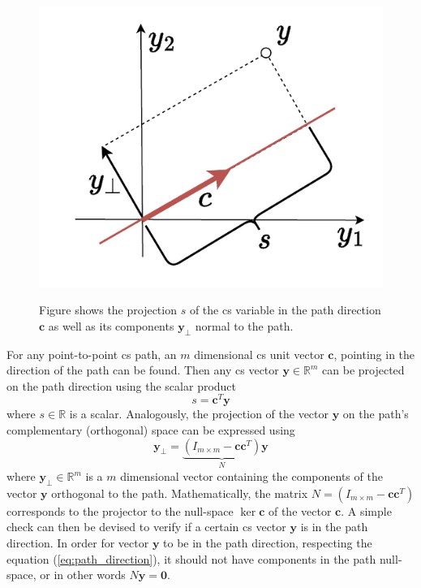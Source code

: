 \begin{figure}
\vspace{-0.5cm}
    \includegraphics[width=\linewidth]{Papers/imgs/decomposiiton.pdf}
    \label{fig:decomp}
    \caption{Figure shows the projection $s$ of the \gls{cs} variable in the path direction $\bm{c}$ as well as its components $\bm{y}_{\perp}$ normal to the path.}
\end{figure}
For any point-to-point \gls{cs} path, an $m$ dimensional \gls{cs} unit vector $\bm{c}$, pointing in the direction of the path can be found. Then any \gls{cs} vector $\bm{y}\in\mathbb{R}^m$ can be projected on the path direction using the scalar product
\begin{equation}
s = \bm{c}^T\bm{y}
\label{eq:path_direction}
\end{equation}
where $s\in\mathbb{R}$ is a scalar. Analogously, the projection of the vector $\bm{y}$ on the path's complementary (orthogonal) space can be expressed using \cite[p. 431]{meyer2001Matrix}
\begin{equation}
\bm{y}_\perp = \underbrace{(I_{m\times m} - \bm{c}\bm{c}^T)}_{N}\bm{y}
\label{eq:path_orthoonal}
\end{equation}
where $\bm{y}_\perp\in\mathbb{R}^m$ is a $m$ dimensional vector containing the components of the vector $\bm{y}$ orthogonal to the path. Mathematically, the matrix $N = (I_{m\times m} - \bm{c}\bm{c}^T)$ corresponds to the projector to the null-space $\ker{\bm{c}}$ of the vector $\bm{c}$. A simple check can then be devised to verify if a certain \gls{cs} vector $\bm{y}$ is in the path direction. In order for vector $\bm{y}$ to be in the path direction, respecting the equation (\ref{eq:path_direction}), it should not have components in the path null-space, or in other words  $N\bm{y}=\bm{0}$.

